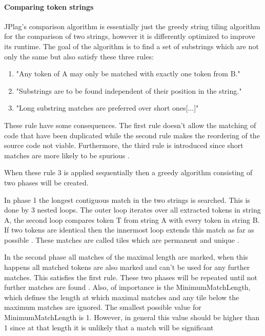 \documentclass[a4paper, 11pt]{article}
\renewcommand{\\}{\vspace*{0.5\baselineskip} \newline}
\begin{document}
\paragraph{Comparing token strings}

JPlag's comparison algorithm is essentially just the greedy string tiling algorithm for the comparison of two strings, however it is differently
optimized to improve its runtime\autocite[p. 5]{JPlagP}. The goal of the algorithm is to find a set of substrings
which are not only the same but also satisfy these three rules:

\begin{enumerate}
	\item "Any token of A may only be matched with exactly one token from B."
	\item "Substrings are to be found independent of their position in the string."
	\item "Long substring matches are preferred over short ones[...]"
\end{enumerate}\autocite[p. 11]{JPlagP}

These rule have some consequences. The first rule doesn't allow the matching of code that have been duplicated while
the second rule makes the reordering of the source code not viable. Furthermore, the third rule is introduced since
short matches are more likely to be spurious \autocite[p. 11]{JPlagP}.

When these rule 3 is applied sequentially then a greedy algorithm consisting of two phases will be created.

In phase 1 the longest contiguous match in the two strings is searched. This is done by 3 nested loops. The outer loop iterates over all extracted
tokens in string A, the second loop compares token T from string A with every token in string B. If two tokens are identical then the innermost loop
extends this match as far as possible \autocite[p. 11]{JPlagP}. These matches are called tiles which are permanent and unique \autocite[p. 3]{GST}.

In the second phase all matches of the maximal length are marked, when this happens all matched tokens are also marked and can't be used for any
further matches. This satisfies the first rule. These two phases will be repeated until not further matches are found \autocite[p. 11]{JPlagP}.
Also, of importance is the MinimumMatchLength, which defines the length at which maximal matches and any tile below the maximum matches are ignored.
The smallest possible value for MinimumMatchLength is 1. However, in general this value should be higher than 1 since at that length it is unlikely
that a match will be significant \autocite[p. 3]{GST}
\end{document}
